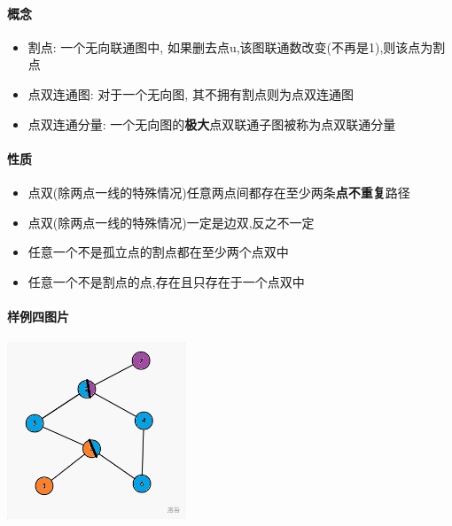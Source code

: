 \paragraph{概念}

\begin{itemize}
    \item 割点: 一个无向联通图中, 如果删去点u,该图联通数改变(不再是1),则该点为割点
    \item 点双连通图: 对于一个无向图, 其不拥有割点则为点双连通图
    \item 点双连通分量: 一个无向图的\textbf{极大}点双联通子图被称为点双联通分量
\end{itemize}

\paragraph{性质}

\begin{itemize}
    \item 点双(除两点一线的特殊情况)任意两点间都存在至少两条\textbf{点不重复}路径
    \item 点双(除两点一线的特殊情况)一定是边双,反之不一定
    \item 任意一个不是孤立点的割点都在至少两个点双中
    \item 任意一个不是割点的点,存在且只存在于一个点双中
\end{itemize}

\paragraph{样例四图片}

\begin{center}
    \includegraphics[width=0.4\textwidth]{img/luogu-P8435-1.png}
\end{center}

